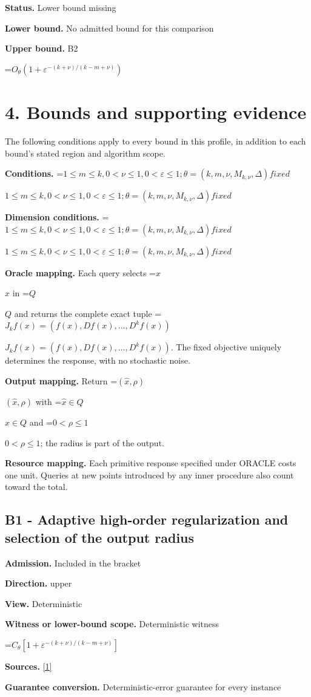 \documentclass[10pt,a4paper]{article}
\newcommand{\AtlasMath}[1]{\par\begingroup\centering\setbox0=\hbox{$\displaystyle #1$}\ifdim\wd0>1.4\linewidth\typeout{ATLAS WIDE FORMULA: \the\wd0}\fi\ifdim\wd0>\linewidth\resizebox{\linewidth}{!}{\box0}\else\box0\fi\par\endgroup}
\newcommand{\AtlasInlineMath}[1]{\begingroup\setbox0=\hbox{$#1$}\ifdim\wd0>.4\linewidth\endgroup\AtlasMath{#1}\else\endgroup$#1$\fi}
\begin{document}
\textbf{Status.} Lower bound missing

\textbf{Lower bound.} No admitted bound for this comparison

\textbf{Upper bound.} B2

\AtlasMath{O_\theta(1+\varepsilon^{-(k+\nu)/(k-m+\nu)})}
\section{4. Bounds and supporting evidence}
The following conditions apply to every bound in this profile, in addition to each bound's stated region and algorithm scope.

\textbf{Conditions.} \AtlasInlineMath{1\le m\le k,0<\nu\le 1,0<\varepsilon\le 1;\theta=(k,m,\nu,M_{k,\nu},\Delta) fixed}

\textbf{Dimension conditions.} \AtlasInlineMath{1\le m\le k,0<\nu\le 1,0<\varepsilon\le 1;\theta=(k,m,\nu,M_{k,\nu},\Delta) fixed}

\textbf{Oracle mapping.} Each query selects \AtlasInlineMath{x} in \AtlasInlineMath{Q} and returns the complete exact tuple \AtlasInlineMath{J_{k}f(x)=(f(x),Df(x),\ldots,D^{k}f(x))}. The fixed objective uniquely determines the response, with no stochastic noise.

\textbf{Output mapping.} Return \AtlasInlineMath{(\widehat{x},\rho)} with \AtlasInlineMath{\widehat{x}\in Q} and \AtlasInlineMath{0<\rho\le1}; the radius is part of the output.

\textbf{Resource mapping.} Each primitive response specified under ORACLE costs one unit. Queries at new points introduced by any inner procedure also count toward the total.

\subsection{B1 - Adaptive high-order regularization and selection of the output radius}
\textbf{Admission.} Included in the bracket

\textbf{Direction.} upper

\textbf{View.} Deterministic

\textbf{Witness or lower-bound scope.} Deterministic witness

\AtlasMath{C_\theta[1+\varepsilon^{-(k+\nu)/(k-m+\nu)}]}
\textbf{Sources.} \href{https://arxiv.org/abs/1811.01220}{[1]}

\textbf{Guarantee conversion.} Deterministic-error guarantee for every instance
\end{document}
